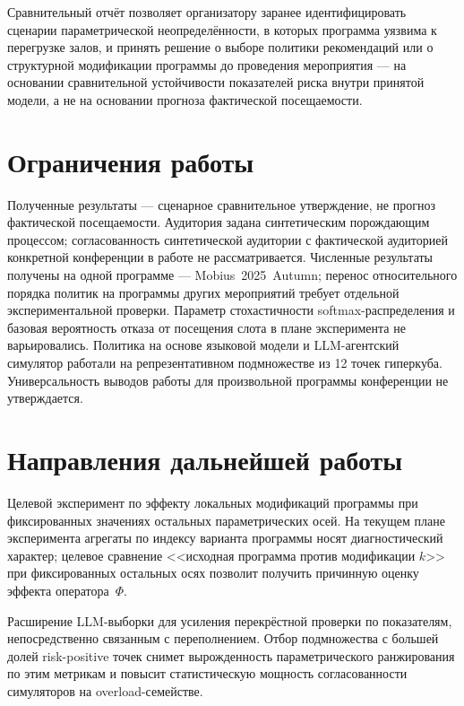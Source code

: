 Сравнительный отчёт позволяет организатору заранее идентифицировать сценарии параметрической неопределённости, в которых программа уязвима к перегрузке залов, и принять решение о выборе политики рекомендаций или о структурной модификации программы до проведения мероприятия --- на основании сравнительной устойчивости показателей риска внутри принятой модели, а не на основании прогноза фактической посещаемости.


\section*{Ограничения работы}

Полученные результаты --- сценарное сравнительное утверждение, не прогноз фактической посещаемости. Аудитория задана синтетическим порождающим процессом; согласованность синтетической аудитории с фактической аудиторией конкретной конференции в работе не рассматривается. Численные результаты получены на одной программе --- Mobius~2025~Autumn; перенос относительного порядка политик на программы других мероприятий требует отдельной экспериментальной проверки. Параметр стохастичности softmax-распределения и базовая вероятность отказа от посещения слота в плане эксперимента не варьировались. Политика на основе языковой модели и LLM-агентский симулятор работали на репрезентативном подмножестве из 12 точек гиперкуба. Универсальность выводов работы для произвольной программы конференции не утверждается.


\section*{Направления дальнейшей работы}

Целевой эксперимент по эффекту локальных модификаций программы при фиксированных значениях остальных параметрических осей. На текущем плане эксперимента агрегаты по индексу варианта программы носят диагностический характер; целевое сравнение <<исходная программа против модификации $k$>> при фиксированных остальных осях позволит получить причинную оценку эффекта оператора~$\Phi$.

Расширение LLM-выборки для усиления перекрёстной проверки по показателям, непосредственно связанным с переполнением. Отбор подмножества с большей долей risk-positive точек снимет вырожденность параметрического ранжирования по этим метрикам и повысит статистическую мощность согласованности симуляторов на overload-семействе.


